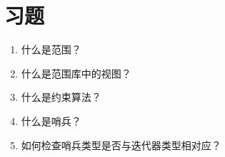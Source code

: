 \section{习题}
\begin{enumerate}
\item
什么是范围？

\item
什么是范围库中的视图？

\item
什么是约束算法？

\item
什么是哨兵？

\item
如何检查哨兵类型是否与迭代器类型相对应？
\end{enumerate}